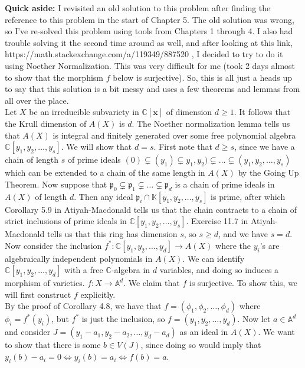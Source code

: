 \documentclass{article}
\theoremstyle{definition}
\newcommand{\C}{\mathbb{C}}
\newcommand{\K}{\mathbb{K}}
\newcommand{\A}{\mathbb{A}}
\newcommand{\x}{\bm{x}}
\begin{document}
\textbf{Quick aside:} I revisited an old solution to this problem after finding
the reference to this problem in the start of Chapter 5. The old solution was
wrong, so I've re-solved this problem using tools from Chapters 1 through 4. I
also had trouble solving it the second time around as well, and after looking
at this link, https://math.stackexchange.com/a/119349/887520 , I decided to try
to do it using Noether Normalization. This was very difficult for me (took 2
days almost to show that the morphism $f$ below is surjective). So, this is all
just a heads up to say that this solution is a bit messy and uses a few
theorems and lemmas from all over the place. \\

Let $X$ be an irreducible subvariety in $\C[\x]$ of dimension $d \geq 1$. It
follows that the Krull dimension of $A(X)$ is $d$. The Noether normalization
lemma tells us that $A(X)$ is integral and finitely generated over some free
polynomial algebra $\C[y_1, y_2, \ldots, y_s]$. We will show that $d = s$.
First note that $d \geq s$, since we have a chain of length $s$ of prime ideals
$(0) \subsetneq (y_1) \subsetneq y_1, y_2) \subsetneq \ldots \subsetneq (y_1,
y_2, \ldots, y_s)$ which can be extended to a chain of the same length in
$A(X)$ by the Going Up Theorem. Now suppose that $\mathfrak{p}_0 \subsetneq
\mathfrak{p}_1 \subsetneq \ldots \subsetneq \mathfrak{p}_d$ is a chain of prime
ideals in $A(X)$ of length $d$. Then any ideal $\mathfrak{p}_i \cap \K[y_1,
y_2, \ldots, y_s]$ is prime, after which Corollary 5.9 in Atiyah-Macdonald
tells us that the chain contracts to a chain of strict inclusions of prime
ideals in $\C[y_1, y_2, \ldots, y_s]$. Exercise 11.7 in Atiyah-Macdonald tells
us that this ring has dimension $s$, so $s \geq d$, and we have $s = d$. \\

Now consider the inclusion $f^{*} : \C[y_1, y_2, \ldots, y_d] \to A(X)$ where
the $y_i$'s are algebraically independent polynomials in $A(X)$. We can
identify $\C[y_1, y_2, \ldots, y_d]$ with a free $\C$-algebra in $d$ variables,
and doing so induces a morphism of varieties. $f : X \to \A^{d}$. We claim that
$f$ is surjective. To show this, we will first construct $f$ explicitly. \\

By the proof of Corollary 4.8, we have that $f =
(\phi_1, \phi_2, \ldots, \phi_d)$ where $\phi_i = f^{*}(y_i)$, but $f^{*}$ is
just the inclusion, so $f = (y_1, y_2, \ldots, y_d)$. Now let $a \in \A^{d}$
and consider $J = (y_1 - a_1, y_2 - a_2, \ldots, y_d - a_d)$ as an ideal in
$A(X)$. We want to show that there is some $b \in V(J)$, since doing so
would imply that $y_i(b) - a_i = 0 \Leftrightarrow y_i(b) = a_i \Leftrightarrow
f(b) = a$. \\ 
\end{document}
